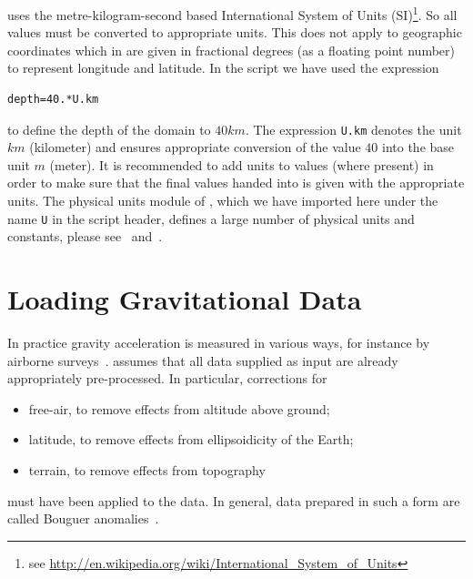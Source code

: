 \downunder uses the metre-kilogram-second based International System of Units
(SI)\footnote{see \url{http://en.wikipedia.org/wiki/International_System_of_Units}}.
So all values must be converted to appropriate units.
This does not apply to geographic coordinates which in \downunder are given in
fractional degrees (as a floating point number) to represent longitude and
latitude. In the script we have used the expression
\begin{verbatim}
depth=40.*U.km
\end{verbatim}
to define the depth of the domain to $40 km$.
The expression \verb|U.km| denotes the unit $km$ (kilometer) and ensures
appropriate conversion of the value $40$ into the base unit $m$ (meter).
It is recommended to add units to values (where present) in order to make sure
that the final values handed into \downunder is given with the appropriate
units.
The physical units module of \escript, which we have imported here under the
name \verb|U| in the script header, defines a large number of physical units
and constants, please see~\cite{ESCRIPT} and~\cite{ESCRIPTONLINE}. 

\section{Loading Gravitational Data}\label{SEC:P1:GRAV:DATA}
In practice gravity acceleration is measured in various ways, for instance by
airborne surveys~\cite{Telford1990a}.
\downunder assumes that all data supplied as input are already appropriately
pre-processed. In particular, corrections for
\begin{itemize}
 \item free-air, to remove effects from altitude above ground;
 \item latitude, to remove effects from ellipsoidicity of the Earth;
 \item terrain, to remove effects from topography
\end{itemize}
must have been applied to the data.
In general, data prepared in such a form are called Bouguer anomalies~\cite{Telford1990a}.

